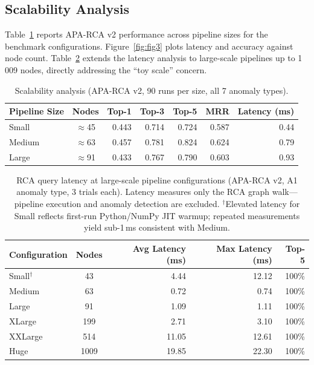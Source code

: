 \documentclass{article}
\newcommand{\aparca}{\textsc{APA-RCA}}
\begin{document}
\subsection{Scalability Analysis}

Table~\ref{tab:scalability} reports \aparca{} v2 performance across pipeline
sizes for the benchmark configurations.
Figure~\ref{fig:fig3} plots latency and accuracy against node count.
Table~\ref{tab:largescale} extends the latency analysis to large-scale
pipelines up to 1\,009 nodes, directly addressing the ``toy scale'' concern.

\begin{table}[h]
  \centering
  \caption{Scalability analysis (\aparca{} v2, 90 runs per size, all 7 anomaly types).}
  \label{tab:scalability}
  \small
  \begin{tabular}{lcrrrrr}
    \toprule
    Pipeline Size & Nodes & Top-1 & Top-3 & Top-5 & MRR & Latency (ms) \\
    \midrule
    Small  & $\approx$45  & 0.443 & 0.714 & 0.724 & 0.587 & 0.44 \\
    Medium & $\approx$63  & 0.457 & 0.781 & 0.824 & 0.624 & 0.79 \\
    Large  & $\approx$91  & 0.433 & 0.767 & 0.790 & 0.603 & 0.93 \\
    \bottomrule
  \end{tabular}
\end{table}

\begin{table}[h]
  \centering
  \caption{RCA query latency at large-scale pipeline configurations
           (\aparca{} v2, A1 anomaly type, 3 trials each).
           Latency measures only the RCA graph walk---pipeline execution and
           anomaly detection are excluded.
           $^\dagger$Elevated latency for Small reflects first-run Python/NumPy JIT
           warmup; repeated measurements yield sub-1\,ms consistent with Medium.}
  \label{tab:largescale}
  \small
  \begin{tabular}{lcrrr}
    \toprule
    Configuration & Nodes & Avg Latency (ms) & Max Latency (ms) & Top-5 \\
    \midrule
    Small$^\dagger$ & 43   & 4.44  & 12.12 & 100\% \\
    Medium  & 63   & 0.72  & 0.74  & 100\% \\
    Large   & 91   & 1.09  & 1.11  & 100\% \\
    XLarge  & 199  & 2.71  & 3.10  & 100\% \\
    XXLarge & 514  & 11.05 & 12.61 & 100\% \\
    Huge    & 1009 & 19.85 & 22.30 & 100\% \\
    \bottomrule
  \end{tabular}
\end{table}
\end{document}
